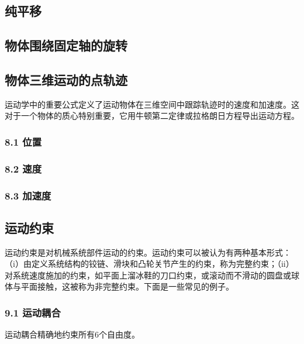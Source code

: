 \subsection{纯平移}



\subsection{ 物体围绕固定轴的旋转}



\subsection{物体三维运动的点轨迹}

运动学中的重要公式定义了运动物体在三维空间中跟踪轨迹时的速度和加速度。这对于一个物体的质心特别重要，它用牛顿第二定律或拉格朗日方程导出运动方程。

\subsubsection{8.1 位置}



\subsubsection{8.2 速度}



\subsubsection{8.3 加速度}



\subsection{运动约束}

运动约束是对机械系统部件运动的约束。运动约束可以被认为有两种基本形式：（i）由定义系统结构的铰链、滑块和凸轮关节产生的约束，称为完整约束；（ii）对系统速度施加的约束，如平面上溜冰鞋的刀口约束，或滚动而不滑动的圆盘或球体与平面接触，这被称为非完整约束。下面是一些常见的例子。

\subsubsection{9.1 运动耦合}

运动耦合精确地约束所有6个自由度。

